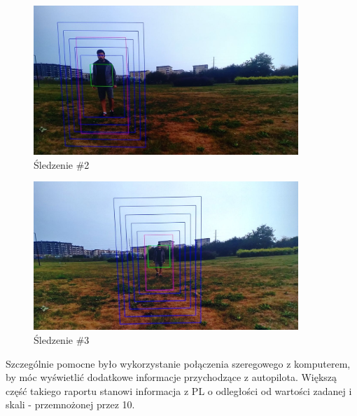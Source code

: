 \begin{figure}[h]
	\centering
	\includegraphics[width=10cm]{6_track_2.jpg}
	\caption{Śledzenie \#2}
	\label{fig:track_1}
\end{figure}

\begin{figure}[h]
	\centering
	\includegraphics[width=10cm]{6_track_3.jpg}
	\caption{Śledzenie \#3}
	\label{fig:track_1}
\end{figure}

Szczególnie pomocne było wykorzystanie połączenia szeregowego z komputerem, by móc wyświetlić dodatkowe informacje przychodzące z autopilota. Większą część takiego raportu stanowi informacja z PL o odległości od wartości zadanej i skali - przemnożonej przez 10.


